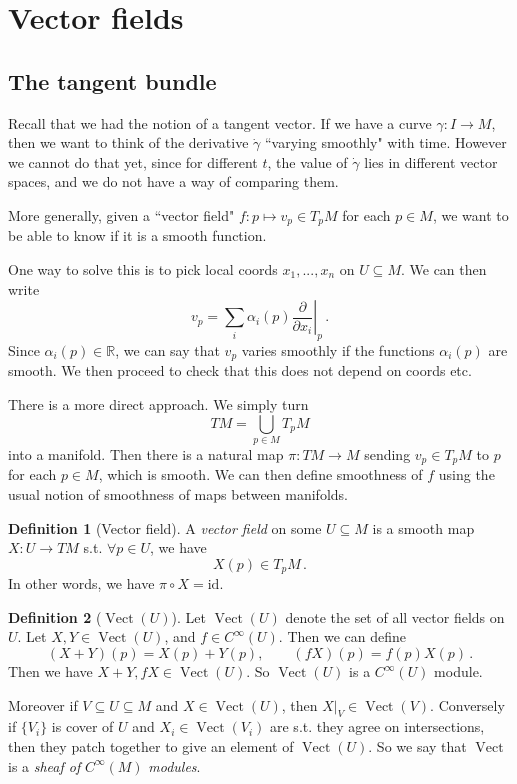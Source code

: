 \documentclass[a4paper,11pt]{article}
\theoremstyle{definition}
\newtheorem*{defn}{Definition}
\DeclareMathOperator{\Vect}{Vect}
\numberwithin{equation}{section}
\begin{document}
\section{Vector fields}
\subsection{The tangent bundle}

Recall that we had the notion of a tangent vector. If we have a curve $\gamma:I\rightarrow M$, then we want to think of the derivative $\dot{\gamma}$ ``varying smoothly" with time. However we cannot do that yet, since for different $t$, the value of $\dot{\gamma}$ lies in different vector spaces, and we do not have a way of comparing them.

More generally, given a ``vector field" $f:p\mapsto v_p\in T_pM$ for each $p\in M$, we want to be able to know if it is a smooth function.

One way to solve this is to pick local coords $x_1,...,x_n$ on $U\subseteq M$. We can then write
\[
v_p=\sum_i\alpha_i(p)\left.\frac{\partial}{\partial x_i}\right|_p\,.
\]
Since $\alpha_i(p)\in\mathbb{R}$, we can say that $v_p$ varies smoothly if the functions $\alpha_i(p)$ are smooth. We then proceed to check that this does not depend on coords etc.

There is a more direct approach. We simply turn
\[
TM=\bigcup_{p\in M}T_pM
\]
into a manifold. Then there is a natural map $\pi:TM\rightarrow M$ sending $v_p\in T_pM$ to $p$ for each $p\in M$, which is smooth. We can then define smoothness of $f$ using the usual notion of smoothness of maps between manifolds.

\begin{defn}[Vector field]
A \emph{vector field} on some $U\subseteq M$ is a smooth map $X:U\rightarrow TM$ s.t. $\forall p\in U$, we have
\[
X(p)\in T_pM\,.
\]
In other words, we have $\pi\circ X=\text{id}$.
\end{defn}

\begin{defn}[$\Vect(U)$]
Let $\Vect(U)$ denote the set of all vector fields on $U$. Let $X,Y\in\Vect(U)$, and $f\in C^\infty(U)$. Then we can define
\[
(X+Y)(p)=X(p)+Y(p),\qquad (fX)(p)=f(p)X(p)\,.
\]
Then we have $X+Y, fX\in\Vect(U)$. So $\Vect(U)$ is a $C^\infty(U)$ module.
\end{defn}

Moreover if $V\subseteq U\subseteq M$ and $X\in\Vect(U)$, then $X|_V\in\Vect(V)$. Conversely if $\{V_i\}$ is cover of $U$ and $X_i\in\Vect(V_i)$ are s.t. they agree on intersections, then they patch together to give an element of $\Vect(U)$. So we say that $\Vect$ is a \emph{sheaf of} $C^\infty(M)$ \emph{modules}.
\end{document}
